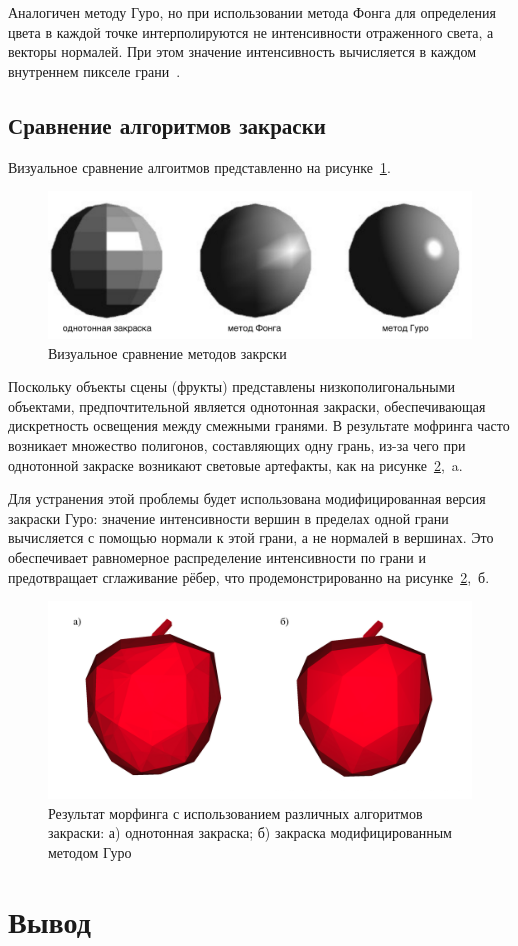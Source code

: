     Аналогичен методу Гуро, но при использовании метода Фонга для определения цвета в каждой точке интерполируются не интенсивности отраженного света, а векторы нормалей. При этом значение интенсивность вычисляется в каждом внутреннем пикселе грани~\cite{rogers,porev}.
    
    \subsection{Сравнение алгоритмов закраски}
    
    Визуальное сравнение алгоитмов представленно на рисунке~\ref{fig:shading_comparison}.
    
    \begin{figure}[H]
    	\centering
    	\includegraphics[width=1\textwidth]{../inc/images/shading_2}
    	\caption{Визуальное сравнение методов закрски}
	    \label{fig:shading_comparison}
    \end{figure}
    
    Поскольку объекты сцены (фрукты) представлены низкополигональными объектами, предпочтительной является однотонная закраски, обеспечивающая дискретность освещения между смежными гранями. В результате мофринга часто возникает множество полигонов, составляющих одну грань, из-за чего при однотонной закраске возникают световые артефакты, как на рисунке~\ref{fig:gouraund_midified},~a.
    
    Для устранения этой проблемы будет использована модифицированная версия закраски Гуро: значение интенсивности вершин в пределах одной грани вычисляется с помощью нормали к этой грани, а не нормалей в вершинах. Это обеспечивает равномерное распределение интенсивности по грани и предотвращает сглаживание рёбер, что продемонстрированно на рисунке~\ref{fig:gouraund_midified},~б.
    
    \begin{figure}[H]
	    \includegraphics[width=\linewidth]{../inc/images/gouraund_modified}
	    \caption{Результат морфинга с использованием различных алгоритмов закраски: а) однотонная закраска; б) закраска модифицированным методом Гуро}
 	    \label{fig:gouraund_midified}
    \end{figure}

\section*{Вывод}


\clearpage